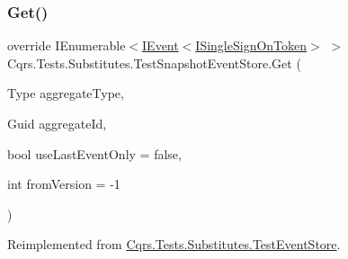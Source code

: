 \subsubsection{\texorpdfstring{Get()}{Get()}}
{\footnotesize\ttfamily override I\+Enumerable$<$\hyperlink{interfaceCqrs_1_1Events_1_1IEvent}{I\+Event}$<$\hyperlink{interfaceCqrs_1_1Authentication_1_1ISingleSignOnToken}{I\+Single\+Sign\+On\+Token}$>$ $>$ Cqrs.\+Tests.\+Substitutes.\+Test\+Snapshot\+Event\+Store.\+Get (\begin{DoxyParamCaption}\item[{Type}]{aggregate\+Type,  }\item[{Guid}]{aggregate\+Id,  }\item[{bool}]{use\+Last\+Event\+Only = {\ttfamily false},  }\item[{int}]{from\+Version = {\ttfamily -\/1} }\end{DoxyParamCaption})\hspace{0.3cm}{\ttfamily [virtual]}}



Reimplemented from \hyperlink{classCqrs_1_1Tests_1_1Substitutes_1_1TestEventStore_a58e89fab7fdfafff88c62317b6765e55}{Cqrs.\+Tests.\+Substitutes.\+Test\+Event\+Store}.

